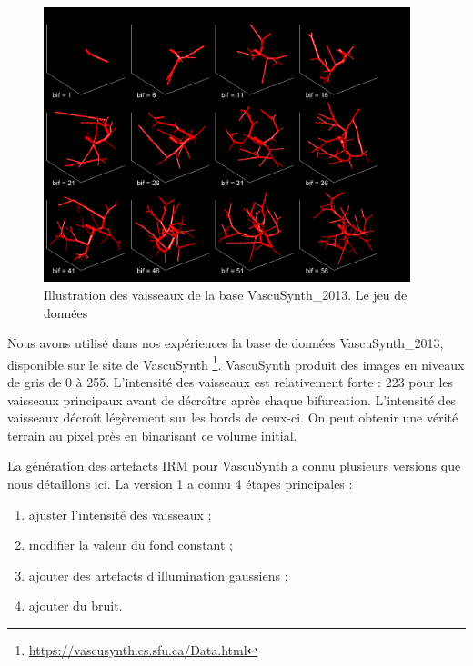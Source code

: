 \begin{figure}[!ht]
  \centering
  \includegraphics[height=8cm]{Images/snapVascu.png}
  
  \caption{Illustration des vaisseaux de la base VascuSynth\_2013. Le jeu de données }
  \label{fig:snap_vascu}
\end{figure}
Nous avons utilisé dans nos expériences la base de données VascuSynth\_2013, disponible sur le site de VascuSynth \footnote{\url{https://vascusynth.cs.sfu.ca/Data.html}}. VascuSynth produit des images en niveaux de gris de 0 à 255. L'intensité des vaisseaux est relativement forte : 223 pour les vaisseaux principaux avant de décroître après chaque bifurcation. L'intensité des vaisseaux décroît légèrement sur les bords de ceux-ci. On peut obtenir une vérité terrain au pixel près en binarisant ce volume initial.

La génération des artefacts IRM pour VascuSynth a connu plusieurs versions que nous détaillons ici. La version 1 a connu 4 étapes principales :
\begin{enumerate}
\item ajuster l'intensité des vaisseaux ;
\item modifier la valeur du fond constant ; 
\item ajouter des artefacts d'illumination gaussiens ;
\item ajouter du bruit.
\end{enumerate}
